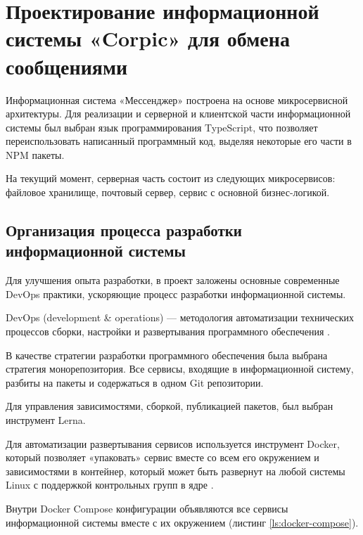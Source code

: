 \chapter{Проектирование информационной системы «Corpic» для обмена сообщениями}

Информационная система «Мессенджер» построена на основе микросервисной архитектуры. Для реализации и серверной и клиентской части информационной системы был выбран язык программирования TypeScript, что позволяет переиспользовать написанный программный код, выделяя некоторые его части в NPM пакеты.

На текущий момент, серверная часть состоит из следующих микросервисов: файловое хранилище, почтовый сервер, сервис с основной бизнес-логикой.

\section{Организация процесса разработки информационной системы}

Для улучшения опыта разработки, в проект заложены основные современные DevOps практики, ускоряющие процесс разработки информационной системы.

DevOps (development \& operations) — методология автоматизации технических процессов сборки, настройки и развертывания программного обеспечения \cite{DevOps}.

В качестве стратегии разработки программного обеспечения была выбрана стратегия монорепозитория. Все сервисы, входящие в информационной систему, разбиты на пакеты и содержаться в одном Git репозитории.

Для управления зависимостями, сборкой, публикацией пакетов, был выбран инструмент Lerna.

Для автоматизации развертывания сервисов используется инструмент Docker, который позволяет «упаковать» сервис вместе со всем его окружением и зависимостями в контейнер, который может быть развернут на любой системы Linux с поддержкой контрольных групп в ядре \cite{Docker}.

Внутри Docker Compose конфигурации объявляются все сервисы информационной системы вместе с их окружением (листинг \ref{ls:docker-compose}).

